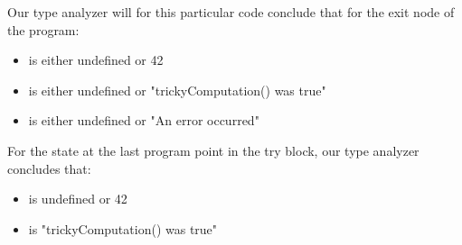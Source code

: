 Our type analyzer will for this particular code conclude that for the exit node of the program:

\begin{itemize}
	\item {} is either undefined or 42
	\item {} is either undefined or "trickyComputation() was true"
	\item {} is either undefined or "An error occurred"
\end{itemize}

For the state at the last program point in the try block, our type analyzer concludes that:

\begin{itemize}
	\item {} is undefined or 42
	\item {} is "trickyComputation() was true"
\end{itemize}
